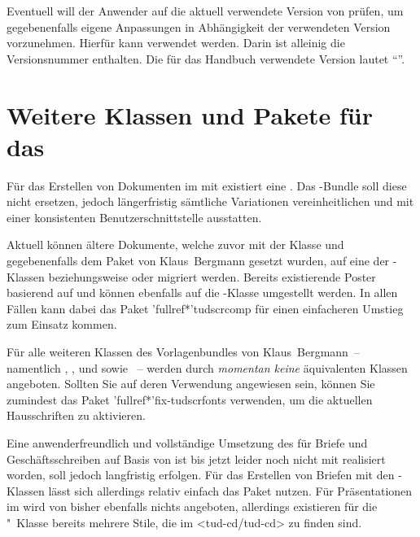 \begin{Entity}{}
\begin{Declaration}
\begin{Declaration}
Eventuell will der Anwender auf die aktuell verwendete Version von \TUDScript 
prüfen, um gegebenenfalls eigene Anpassungen in Abhängigkeit der verwendeten 
Version vorzunehmen. Hierfür kann  verwendet 
werden. Darin ist alleinig die Versionsnummer enthalten. Die für das Handbuch 
verwendete Version lautet \enquote{\TUDScriptVersionNumber}.
\end{Declaration}
\end{Declaration}
\end{Entity}



\section{Weitere Klassen und Pakete für das \CD}

Für das Erstellen von Dokumenten im \TUDCD mit  existiert eine 
. Das \TUDScript-Bundle soll diese nicht ersetzen, 
jedoch längerfristig sämtliche Variationen vereinheitlichen und mit einer 
konsistenten Benutzerschnittstelle ausstatten. 

Aktuell können ältere Dokumente, welche zuvor mit der Klasse  
und gegebenenfalls dem Paket  von Klaus~Bergmann gesetzt 
wurden, auf eine der \TUDScript-Klassen  beziehungsweise 
 oder  migriert werden. Bereits 
existierende Poster basierend auf  und  
können ebenfalls auf die \TUDScript-Klasse  umgestellt 
werden. In allen Fällen kann dabei das Paket \Package'fullref*'{tudscrcomp} für 
einen einfacheren Umstieg zum Einsatz kommen. 

Für alle weiteren Klassen des Vorlagenbundles von Klaus~Bergmann~-- namentlich 
, ,  und  
sowie ~-- werden durch \TUDScript \emph{momentan keine} 
äquivalenten Klassen angeboten. Sollten Sie auf deren Verwendung angewiesen 
sein, können Sie zumindest das Paket \Package'fullref*'{fix-tudscrfonts} 
verwenden, um die aktuellen Hausschriften zu aktivieren.

Eine anwenderfreundlich und vollständige Umsetzung des \CDs für Briefe und 
Geschäftsschreiben auf Basis von \KOMAScript ist bis jetzt leider noch nicht 
mit \TUDScript realisiert worden, soll jedoch langfristig erfolgen. Für das 
Erstellen von Briefen mit den \TUDScript-Klassen lässt sich allerdings relativ 
einfach das Paket  nutzen. Für Präsentationen im \TUDCD wird 
von \TUDScript bisher ebenfalls nichts angeboten, allerdings existieren für die 
"~Klasse bereits mehrere Stile, die im \GitHubRepo<tud-cd/tud-cd> 
zu finden sind. 
